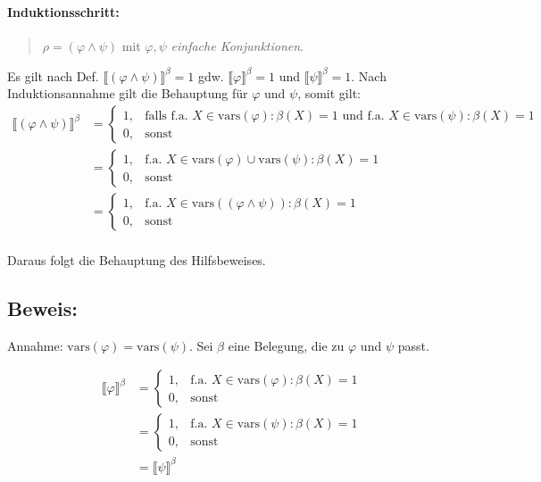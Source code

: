 \documentclass[12pt,a4paper]{scrartcl}
\begin{document}
\paragraph*{Induktionsschritt:}
\begin{quote}
$\rho = (\varphi \wedge \psi)$ mit $\varphi, \psi$ \emph{einfache Konjunktionen}.
\end{quote}
Es gilt nach Def. $\llbracket (\varphi \wedge \psi)\rrbracket^\beta = 1$ gdw. $\llbracket \varphi\rrbracket^\beta = 1$ und
$\llbracket \psi\rrbracket^\beta = 1$. Nach Induktionsannahme gilt die Behauptung für
$\varphi$ und $\psi$, somit gilt:
\begin{align*}
\llbracket (\varphi \wedge \psi)\rrbracket^\beta
&= \begin{cases}
1, & \textrm{falls f.a. }X\in \textrm{vars}(\varphi): \beta(X) = 1 \textrm{ und } \textrm{f.a. }X\in \textrm{vars}(\psi): \beta(X) = 1\\
0, & \textrm{sonst}
\end{cases}\\
&= \begin{cases}
1, & \textrm{f.a. }X\in \textrm{vars}(\varphi) \cup \textrm{vars}(\psi): \beta(X) = 1 \\
0, & \textrm{sonst}
\end{cases}\\
&= \begin{cases}
1, & \textrm{f.a. }X\in \textrm{vars}((\varphi \wedge \psi)): \beta(X) = 1 \\
0, & \textrm{sonst}
\end{cases}
\end{align*}\\
Daraus folgt die Behauptung des Hilfsbeweises.

\subsection*{Beweis:}

Annahme: $\textrm{vars}(\varphi) = \textrm{vars}(\psi)$. Sei $\beta$ eine Belegung, die zu
$\varphi$ und $\psi$ passt.

\begin{align}
\llbracket \varphi\rrbracket^\beta
&= \begin{cases}
1, & \textrm{f.a. }X\in \textrm{vars}(\varphi): \beta(X) = 1\\
0, & \textrm{sonst}
\end{cases}\\
&= \begin{cases}
1, & \textrm{f.a. }X\in \textrm{vars}(\psi): \beta(X) = 1\\
0, & \textrm{sonst}
\end{cases}\\
&= \llbracket \psi\rrbracket^\beta
\end{align}\\
\end{document}
